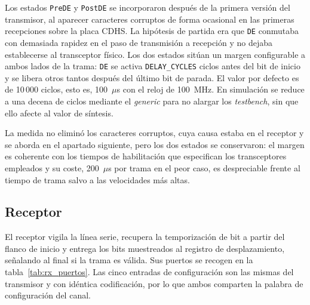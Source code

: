 Los estados \texttt{PreDE} y \texttt{PostDE} se incorporaron después de la primera versión del
transmisor, al aparecer caracteres corruptos de forma ocasional en las primeras recepciones sobre
la placa CDHS. La hipótesis de partida era que \texttt{DE} conmutaba con demasiada rapidez en el
paso de transmisión a recepción y no dejaba establecerse al transceptor físico. Los dos estados
sitúan un margen configurable a ambos lados de la trama: \texttt{DE} se activa
\texttt{DELAY\_CYCLES} ciclos antes del bit de inicio y se libera otros tantos después del último
bit de parada. El valor por defecto es de 10\,000 ciclos, esto es, 100~$\mu$s con el reloj de
100~MHz. En simulación se reduce a una decena de ciclos mediante el \textit{generic} para no
alargar los \textit{testbench}, sin que ello afecte al valor de síntesis.

La medida no eliminó los caracteres corruptos, cuya causa estaba en el receptor y se aborda en el
apartado siguiente, pero los dos estados se conservaron: el margen es coherente con los tiempos
de habilitación que especifican los transceptores empleados y su coste, 200~$\mu$s por trama en el
peor caso, es despreciable frente al tiempo de trama salvo a las velocidades más altas.

\subsection{Receptor}

El receptor vigila la línea serie, recupera la temporización de bit a partir del flanco de inicio y
entrega los bits muestreados al registro de desplazamiento, señalando al final si la trama es
válida. Sus puertos se recogen en la tabla~\ref{tab:rx_puertos}. Las cinco entradas de
configuración son las mismas del transmisor y con idéntica codificación, por lo que ambos
comparten la palabra de configuración del canal.

